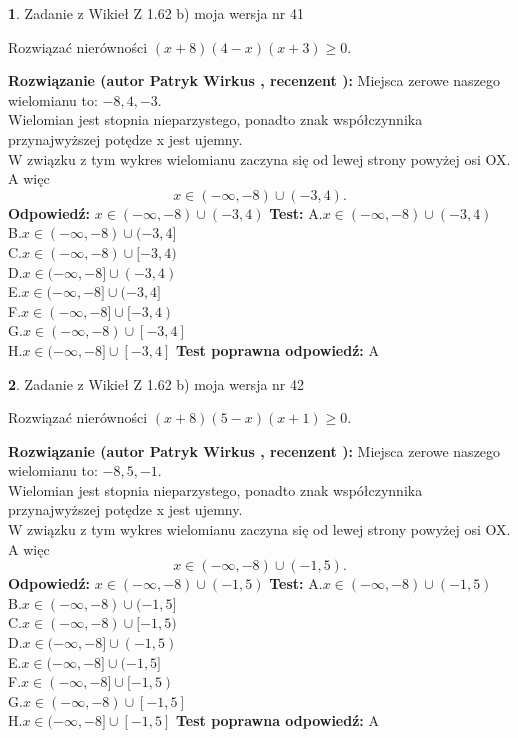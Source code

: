 \documentclass[12pt, a4paper]{article}
\theoremstyle{definition} %
\newtheorem{zad}{}
\newcommand{\zadStart}[1]{\begin{zad}#1\newline}
\newcommand{\zadStop}{\end{zad}}
\newcommand{\rozwStart}[2]{\noindent \textbf{Rozwiązanie (autor #1 , recenzent #2): }\newline}
\newcommand{\rozwStop}{\newline}
\newcommand{\odpStart}{\noindent \textbf{Odpowiedź:}\newline}
\newcommand{\odpStop}{\newline}
\newcommand{\testStart}{\noindent \textbf{Test:}\newline}
\newcommand{\testStop}{\newline}
\newcommand{\kluczStart}{\noindent \textbf{Test poprawna odpowiedź:}\newline}
\newcommand{\kluczStop}{\newline}
\begin{document}
\zadStart{Zadanie z Wikieł Z 1.62 b) moja wersja nr 41}

Rozwiązać nierówności $(x+8)(4-x)(x+3)\ge0$.
\zadStop
\rozwStart{Patryk Wirkus}{}
Miejsca zerowe naszego wielomianu to: $-8, 4, -3$.\\
Wielomian jest stopnia nieparzystego, ponadto znak współczynnika przy\linebreak najwyższej potędze x jest ujemny.\\ W związku z tym wykres wielomianu zaczyna się od lewej strony powyżej osi OX. A więc $$x \in (-\infty,-8) \cup (-3,4).$$
\rozwStop
\odpStart
$x \in (-\infty,-8) \cup (-3,4)$
\odpStop
\testStart
A.$x \in (-\infty,-8) \cup (-3,4)$\\
B.$x \in (-\infty,-8) \cup (-3,4]$\\
C.$x \in (-\infty,-8) \cup [-3,4)$\\
D.$x \in (-\infty,-8] \cup (-3,4)$\\
E.$x \in (-\infty,-8] \cup (-3,4]$\\
F.$x \in (-\infty,-8] \cup [-3,4)$\\
G.$x \in (-\infty,-8) \cup [-3,4]$\\
H.$x \in (-\infty,-8] \cup [-3,4]$
\testStop
\kluczStart
A
\kluczStop



\zadStart{Zadanie z Wikieł Z 1.62 b) moja wersja nr 42}

Rozwiązać nierówności $(x+8)(5-x)(x+1)\ge0$.
\zadStop
\rozwStart{Patryk Wirkus}{}
Miejsca zerowe naszego wielomianu to: $-8, 5, -1$.\\
Wielomian jest stopnia nieparzystego, ponadto znak współczynnika przy\linebreak najwyższej potędze x jest ujemny.\\ W związku z tym wykres wielomianu zaczyna się od lewej strony powyżej osi OX. A więc $$x \in (-\infty,-8) \cup (-1,5).$$
\rozwStop
\odpStart
$x \in (-\infty,-8) \cup (-1,5)$
\odpStop
\testStart
A.$x \in (-\infty,-8) \cup (-1,5)$\\
B.$x \in (-\infty,-8) \cup (-1,5]$\\
C.$x \in (-\infty,-8) \cup [-1,5)$\\
D.$x \in (-\infty,-8] \cup (-1,5)$\\
E.$x \in (-\infty,-8] \cup (-1,5]$\\
F.$x \in (-\infty,-8] \cup [-1,5)$\\
G.$x \in (-\infty,-8) \cup [-1,5]$\\
H.$x \in (-\infty,-8] \cup [-1,5]$
\testStop
\kluczStart
A
\kluczStop
\end{document}
